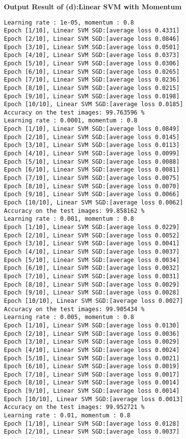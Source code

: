 \documentclass[10pt]{article}
\newcommand{\0}{{\mathbf{0}}}
\newcommand{\1}{{\mathbf{1}}}
\begin{document}
\newpage
\textbf{Output Result of (d):Linear SVM with Momentum}
\begin{verbatim}
Learning rate : 1e-05, momentum : 0.8
Epoch [1/10], Linear SVM SGD:[average loss 0.4331]
Epoch [2/10], Linear SVM SGD:[average loss 0.0846]
Epoch [3/10], Linear SVM SGD:[average loss 0.0501]
Epoch [4/10], Linear SVM SGD:[average loss 0.0373]
Epoch [5/10], Linear SVM SGD:[average loss 0.0306]
Epoch [6/10], Linear SVM SGD:[average loss 0.0265]
Epoch [7/10], Linear SVM SGD:[average loss 0.0236]
Epoch [8/10], Linear SVM SGD:[average loss 0.0215]
Epoch [9/10], Linear SVM SGD:[average loss 0.0198]
Epoch [10/10], Linear SVM SGD:[average loss 0.0185]
Accuracy on the test images: 99.763596 %
Learning rate : 0.0001, momentum : 0.8
Epoch [1/10], Linear SVM SGD:[average loss 0.0849]
Epoch [2/10], Linear SVM SGD:[average loss 0.0145]
Epoch [3/10], Linear SVM SGD:[average loss 0.0113]
Epoch [4/10], Linear SVM SGD:[average loss 0.0099]
Epoch [5/10], Linear SVM SGD:[average loss 0.0088]
Epoch [6/10], Linear SVM SGD:[average loss 0.0081]
Epoch [7/10], Linear SVM SGD:[average loss 0.0075]
Epoch [8/10], Linear SVM SGD:[average loss 0.0070]
Epoch [9/10], Linear SVM SGD:[average loss 0.0066]
Epoch [10/10], Linear SVM SGD:[average loss 0.0062]
Accuracy on the test images: 99.858162 %
Learning rate : 0.001, momentum : 0.8
Epoch [1/10], Linear SVM SGD:[average loss 0.0229]
Epoch [2/10], Linear SVM SGD:[average loss 0.0052]
Epoch [3/10], Linear SVM SGD:[average loss 0.0041]
Epoch [4/10], Linear SVM SGD:[average loss 0.0037]
Epoch [5/10], Linear SVM SGD:[average loss 0.0034]
Epoch [6/10], Linear SVM SGD:[average loss 0.0032]
Epoch [7/10], Linear SVM SGD:[average loss 0.0031]
Epoch [8/10], Linear SVM SGD:[average loss 0.0029]
Epoch [9/10], Linear SVM SGD:[average loss 0.0028]
Epoch [10/10], Linear SVM SGD:[average loss 0.0027]
Accuracy on the test images: 99.905434 %
Learning rate : 0.005, momentum : 0.8
Epoch [1/10], Linear SVM SGD:[average loss 0.0130]
Epoch [2/10], Linear SVM SGD:[average loss 0.0036]
Epoch [3/10], Linear SVM SGD:[average loss 0.0029]
Epoch [4/10], Linear SVM SGD:[average loss 0.0024]
Epoch [5/10], Linear SVM SGD:[average loss 0.0021]
Epoch [6/10], Linear SVM SGD:[average loss 0.0019]
Epoch [7/10], Linear SVM SGD:[average loss 0.0017]
Epoch [8/10], Linear SVM SGD:[average loss 0.0014]
Epoch [9/10], Linear SVM SGD:[average loss 0.0014]
Epoch [10/10], Linear SVM SGD:[average loss 0.0013]
Accuracy on the test images: 99.952721 %
Learning rate : 0.01, momentum : 0.8
Epoch [1/10], Linear SVM SGD:[average loss 0.0128]
Epoch [2/10], Linear SVM SGD:[average loss 0.0037]

\end{verbatim}
\end{document}
